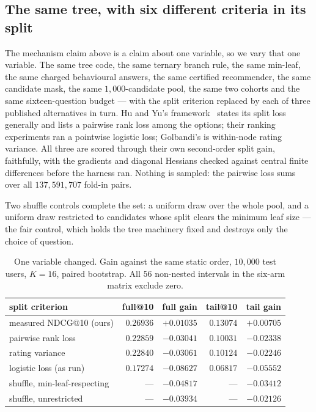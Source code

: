 \documentclass[11pt]{article}
\begin{document}
\subsection{The same tree, with six different criteria in its split}
\label{sec:criterion}
\label{sec:huyu}

The mechanism claim above is a claim about one variable, so we vary that one variable. The same tree
code, the same ternary branch rule, the same min-leaf, the same charged behavioural answers, the same
certified recommender, the same candidate mask, the same $1{,}000$-candidate pool, the same two
cohorts and the same sixteen-question budget --- with the split criterion replaced by each of three
published alternatives in turn. Hu and Yu's framework~\cite{hu2013interview} states its split loss
generally and lists a pairwise rank loss among the options; their ranking experiments ran a pointwise
logistic loss; Golbandi's is within-node rating variance. All three are scored through their own
second-order split gain, faithfully, with the gradients and diagonal Hessians checked against central
finite differences before the harness ran. Nothing is sampled: the pairwise loss sums over all
$137{,}591{,}707$ fold-in pairs.

Two shuffle controls complete the set: a uniform draw over the whole pool, and a uniform draw
restricted to candidates whose split clears the minimum leaf size --- the fair control, which holds
the tree machinery fixed and destroys only the choice of question.

\begin{table}[h]
\centering
\caption{One variable changed. Gain against the same static order, $10{,}000$ test users, $K{=}16$,
paired bootstrap. All $56$ non-nested intervals in the six-arm matrix exclude zero.}
\label{tab:splitcrit}
\small
\begin{tabular}{lrrrr}
\toprule
split criterion & full@10 & full gain & tail@10 & tail gain \\
\midrule
measured NDCG@10 (ours) & $0.26936$ & $\mathbf{+0.01035}$ & $0.13074$ & $\mathbf{+0.00705}$ \\
pairwise rank loss~\cite{hu2013interview} & $0.22859$ & $-0.03041$ & $0.10031$ & $-0.02338$ \\
rating variance~\cite{golbandi2011adaptive} & $0.22840$ & $-0.03061$ & $0.10124$ & $-0.02246$ \\
logistic loss (as run)~\cite{hu2013interview} & $0.17274$ & $-0.08627$ & $0.06817$ & $-0.05552$ \\
\midrule
shuffle, min-leaf-respecting & --- & $-0.04817$ & --- & $-0.03412$ \\
shuffle, unrestricted & --- & $-0.03934$ & --- & $-0.02126$ \\
\bottomrule
\end{tabular}
\end{table}
\end{document}
